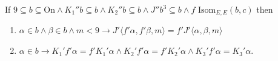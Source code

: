 If $9 \subseteq b \subseteq \mathrm{On} \land K_1''b \subseteq b \land K_2''b \subseteq b \land J''b^3 \subseteq b \land f \text{ Isom}_{E,E}(b, c)$ then
\begin{enumerate}
\item $\alpha \in b \land \beta \in b \land m < 9 \rightarrow J' \langle f' \alpha, f' \beta, m \rangle = f' J' \langle \alpha, \beta, m \rangle$
\item $\alpha \in b \rightarrow K_1' f' \alpha = f' K_1' \alpha \land K_2' f' \alpha = f' K_2' \alpha \land K_3' f' \alpha = K_3' \alpha.$
\end{enumerate}
